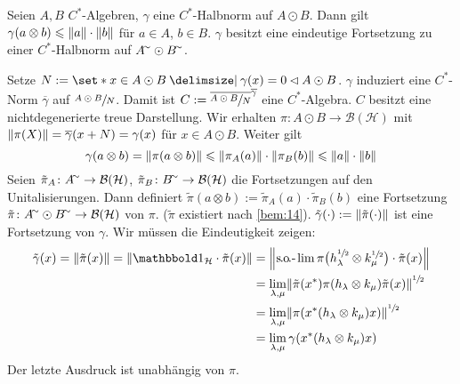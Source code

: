 \begin{korollar}[{name=[{Submultiplikativität bezüglich des Tensorproduktes}]},label=kor:112]
	Seien $A,B$ $C^*$-Algebren, $\gamma$ eine $C^*$-Halbnorm auf $A \odot B$.
	Dann gilt $\gamma(a \otimes b) \le \norm*{a} \cdot \norm*{b}$ für $a \in A$, $b	\in B$.
	$\gamma$ besitzt eine eindeutige Fortsetzung zu einer $C^*$-Halbnorm auf $A^\simm \odot B^\simm$.
\end{korollar}
\begin{beweis}
	Setze $N := \set*{x \in A \odot B \given \gamma(x)=0} \lhd A \odot B$.
	$\gamma$ induziert eine $C^*$-Norm $\overline{\gamma}$ auf $\sfrac{A \odot B}{N}$.
	Damit ist $C := \overline{\sfrac{A \odot B}{N}}^{\overline{\gamma}}$ eine $C^*$-Algebra.
	$C$ besitzt eine nichtdegenerierte treue Darstellung.
	Wir erhalten $\pi \colon A \odot B \to \mathcal{B}(\mathcal{H})$ mit $\norm*{\pi(X)}= \overline{\gamma}(x +N) =\gamma(x)$ für $x \in A \odot B$.
	Weiter gilt
	\[
		\gamma(a \otimes b) = \norm*{\pi(a \otimes b)} \le \norm*{\pi_A(a)} \cdot \norm*{\pi_B(b)} \le \norm*{a} \cdot \norm*{b}
	\]
	Seien $\tilde{\pi}_A \colon A^\simm \to \mathcal{B}(\mathcal{H})$, $\tilde{\pi}_B \colon B^\simm \to \mathcal{B}(\mathcal{H})$ die Fortsetzungen auf den Unitalisierungen.
	Dann definiert $\tilde{\pi}(a \otimes b) := \tilde{\pi}_A(a) \cdot \tilde{\pi}_B(b)$ eine Fortsetzung $\tilde{\pi} \colon A^\simm \odot B^\simm \to \mathcal{B}(\mathcal{H})$ von $\pi$.
	($\tilde{\pi}$ existiert nach \autoref{bem:14}).
	$\tilde{\gamma}(\cdot ) := \norm*{\tilde{\pi}(\cdot)}$ ist eine Fortsetzung von $\gamma$.
	Wir müssen die Eindeutigkeit zeigen:
	\begin{align}
		\tilde{\gamma}(x) = \norm*{\tilde{\pi}(x)} = \norm*{\ind_{\mathcal{H}} \cdot \tilde{\pi}(x)} &= \norm*{\solim \pi\enbrace[\big]{h_\lambda^{\sfrac{1}{2}} \otimes k_\mu^{\sfrac{1}{2}}} \cdot \tilde{\pi}(x)} \\
		&= \lim_{\lambda,\mu} \norm*{\tilde{\pi}(x^*) \pi \enbrace*{h_\lambda \otimes k_\mu} \tilde{\pi}(x)}^{\sfrac{1}{2}} \\
		&= \lim_{\lambda,\mu} \norm*{\pi \enbrace*{x^* (h_\lambda \otimes k_\mu) x}}^{\sfrac{1}{2}} \\
		&= \lim_{\lambda,\mu} \gamma \enbrace*{x^*(h_\lambda \otimes k_\mu)x}
	\end{align}
	Der letzte Ausdruck ist unabhängig von $\pi$.
\end{beweis}

